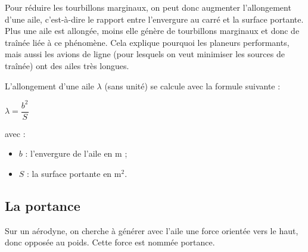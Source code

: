 	Pour réduire les tourbillons marginaux, on peut donc augmenter l'allongement d'une aile, c'est-à-dire le rapport entre l'envergure au carré et la surface portante. Plus une aile est allongée, moins elle génère de tourbillons marginaux et donc de traînée liée à ce phénomène. Cela explique pourquoi les planeurs performants, mais aussi les avions de ligne (pour lesquels on veut minimiser les sources de traînée) ont des ailes très longues.
	
	L'allongement d'une aile $\lambda$ (sans unité) se calcule avec la formule suivante :
	
	 \begin{center}
		\huge{$\lambda = \dfrac{b^2}{S}$}
	\end{center}
	
	avec :
	\begin{itemize}
		\item $b$ : l'envergure de l'aile en $\mathrm{m}$ ;
		\item $S$ : la surface portante en $\mathrm{m}^2$.
	\end{itemize}
	

	
	

\subsection{La portance}
Sur un aérodyne, on cherche à générer avec l'aile une force orientée vers le haut, donc opposée au poids. Cette force est nommée portance.

